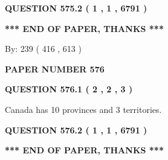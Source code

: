\documentclass[12pt]{article}
\begin{document}
{\textbf{\Large{QUESTION
575.2 
 ( 1 , 1 , 6791 )
}}}
  
  
   
   
 \vspace{0.2in}
 
   
   
   
   
\vspace{1.0in} 
{\textbf{\large{ *** END OF PAPER, THANKS *** }}} 
   
   
\hspace{1.0in} By: 
 239 ( 416 ,  613 )
   
   
   
   
\newpage 
\setcounter{page}{ 
   576001 } 
   
   
   
   
 {\textbf{ \Large{ PAPER NUMBER  576  }}}
   
   
\vspace{0.2in}
   
   
   
   
   
   
 \vspace{0.2in}
 
 
 
 
   
   
  
\vspace{0.2in}
  
{\textbf{\Large{QUESTION
576.1 
 ( 2 , 2 , 3 )
}}}
  
  
 
 
\noindent{}
 
 
Canada has 10  provinces and 3 territories.
 
 
 
 
  
\vspace{0.2in}
  
{\textbf{\Large{QUESTION
576.2 
 ( 1 , 1 , 6791 )
}}}
  
  
   
   
 \vspace{0.2in}
 
   
   
   
   
\vspace{1.0in} 
{\textbf{\large{ *** END OF PAPER, THANKS *** }}} 
   
\end{document}
